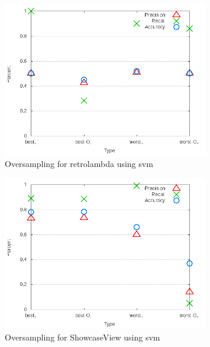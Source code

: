 \begin{figure}[!t]
\centering
\includegraphics[width=0.8\textwidth]{images/svm/test_4/retrolambda_sample_range.png}
\caption{Oversampling for retrolambda using \gls{svm}}
\label{fig:test_4_retrolambda_svm}
\end{figure}

\begin{figure}[!t]
\centering
\includegraphics[width=0.8\textwidth]{images/svm/test_4/ShowcaseView_sample_range.png}
\caption{Oversampling for ShowcaseView using \gls{svm}}
\label{fig:test_4_ShowcaseView_svm}
\end{figure}

